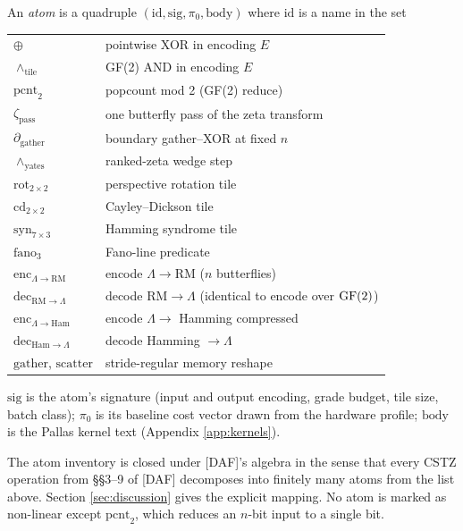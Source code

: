 \begin{definition}[Atom]\label{def:atom}
  An \emph{atom} is a quadruple $(\mathrm{id},
  \mathrm{sig}, \pi_0, \mathrm{body})$ where
  $\mathrm{id}$ is a name in the set
  \begin{center}
  \begin{tabular}{ll}
    $\oplus$ & pointwise XOR in encoding $E$ \\
    $\wedge_{\mathrm{tile}}$ & GF(2) AND in encoding $E$ \\
    $\mathrm{pcnt}_2$ & popcount mod 2 (GF(2) reduce) \\
    $\zeta_{\mathrm{pass}}$ & one butterfly pass of the zeta transform \\
    $\partial_{\mathrm{gather}}$ & boundary gather--XOR at fixed $n$ \\
    $\wedge_{\mathrm{yates}}$ & ranked-zeta wedge step \\
    $\mathrm{rot}_{2 \times 2}$ & perspective rotation tile \\
    $\mathrm{cd}_{2 \times 2}$ & Cayley--Dickson tile \\
    $\mathrm{syn}_{7 \times 3}$ & Hamming syndrome tile \\
    $\mathrm{fano}_3$ & Fano-line predicate \\
    $\mathrm{enc}_{\Lambda \to \mathrm{RM}}$ & encode $\Lambda \to \mathrm{RM}$ ($n$ butterflies) \\
    $\mathrm{dec}_{\mathrm{RM} \to \Lambda}$ & decode $\mathrm{RM} \to \Lambda$ (identical to encode over $\operatorname{GF}(2)$) \\
    $\mathrm{enc}_{\Lambda \to \mathrm{Ham}}$ & encode $\Lambda \to $ Hamming compressed \\
    $\mathrm{dec}_{\mathrm{Ham} \to \Lambda}$ & decode Hamming $\to \Lambda$ \\
    $\mathrm{gather}$, $\mathrm{scatter}$ & stride-regular memory reshape \\
  \end{tabular}
  \end{center}
  $\mathrm{sig}$ is the atom's signature (input and
  output encoding, grade budget, tile size, batch
  class); $\pi_0$ is its baseline cost vector drawn from
  the hardware profile; $\mathrm{body}$ is the Pallas
  kernel text (Appendix \ref{app:kernels}).
\end{definition}

\begin{remark}
  The atom inventory is closed under [DAF]'s algebra in
  the sense that every CSTZ operation from \S\S3--9 of
  [DAF] decomposes into finitely many atoms from the
  list above. Section \ref{sec:discussion} gives the
  explicit mapping. No atom is marked as non-linear
  except $\mathrm{pcnt}_2$, which reduces an
  $n$-bit input to a single bit.
\end{remark}


